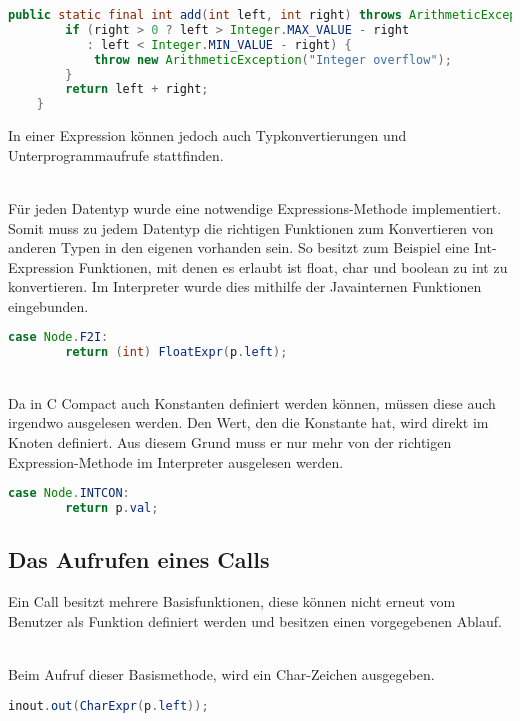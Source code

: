 \begin{lstlisting}[language=JAVA]
	public static final int add(int left, int right) throws ArithmeticException {
		if (right > 0 ? left > Integer.MAX_VALUE - right
           : left < Integer.MIN_VALUE - right) {
			throw new ArithmeticException("Integer overflow");
		}
		return left + right;
	}
\end{lstlisting}

In einer Expression können jedoch auch Typkonvertierungen und Unterprogrammaufrufe stattfinden.

\\
Für jeden Datentyp wurde eine notwendige Expressions-Methode implementiert. Somit muss zu jedem Datentyp die richtigen Funktionen zum Konvertieren von anderen Typen in den eigenen vorhanden sein. So besitzt zum Beispiel eine Int-Expression Funktionen, mit denen es erlaubt ist float, char und boolean zu int zu konvertieren.
Im Interpreter wurde dies mithilfe der Javainternen Funktionen eingebunden. 

\begin{lstlisting}[language=JAVA]
case Node.F2I:
		return (int) FloatExpr(p.left);
\end{lstlisting}


\\
Da in C Compact auch Konstanten definiert werden können, müssen diese auch irgendwo ausgelesen werden. Den Wert, den die Konstante hat, wird direkt im Knoten definiert. Aus diesem Grund muss er nur mehr von der richtigen Expression-Methode im Interpreter ausgelesen werden.

\begin{lstlisting}[language=JAVA]
case Node.INTCON:
		return p.val;
\end{lstlisting}


\subsection{Das Aufrufen eines Calls}
Ein Call besitzt mehrere Basisfunktionen, diese können nicht erneut vom Benutzer als Funktion definiert werden und besitzen einen vorgegebenen Ablauf.

\\
Beim Aufruf dieser Basismethode, wird ein Char-Zeichen ausgegeben.
\begin{lstlisting}[language=JAVA]
inout.out(CharExpr(p.left));
\end{lstlisting}

